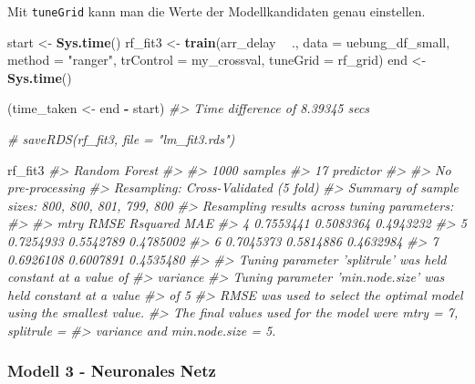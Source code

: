 \documentclass[]{article}
\newenvironment{Shaded}{\begin{snugshade}}{\end{snugshade}}
\newcommand{\CommentTok}[1]{\textcolor[rgb]{0.56,0.35,0.01}{\textit{#1}}}
\newcommand{\DataTypeTok}[1]{\textcolor[rgb]{0.13,0.29,0.53}{#1}}
\newcommand{\KeywordTok}[1]{\textcolor[rgb]{0.13,0.29,0.53}{\textbf{#1}}}
\newcommand{\NormalTok}[1]{#1}
\newcommand{\OperatorTok}[1]{\textcolor[rgb]{0.81,0.36,0.00}{\textbf{#1}}}
\newcommand{\StringTok}[1]{\textcolor[rgb]{0.31,0.60,0.02}{#1}}
\begin{document}
Mit \texttt{tuneGrid} kann man die Werte der Modellkandidaten genau
einstellen.

\begin{Shaded}
\begin{Highlighting}[]
\NormalTok{start <-}\StringTok{ }\KeywordTok{Sys.time}\NormalTok{()}
\NormalTok{rf_fit3 <-}\StringTok{ }\KeywordTok{train}\NormalTok{(arr_delay }\OperatorTok{~}\StringTok{ }\NormalTok{.,}
                 \DataTypeTok{data =}\NormalTok{ uebung_df_small,}
                 \DataTypeTok{method =} \StringTok{"ranger"}\NormalTok{,}
                 \DataTypeTok{trControl =}\NormalTok{ my_crossval,}
                 \DataTypeTok{tuneGrid =}\NormalTok{ rf_grid)}
\NormalTok{end <-}\StringTok{ }\KeywordTok{Sys.time}\NormalTok{()}


\NormalTok{(time_taken <-}\StringTok{ }\NormalTok{end }\OperatorTok{-}\StringTok{ }\NormalTok{start)}
\CommentTok{#> Time difference of 8.39345 secs}

\CommentTok{# saveRDS(rf_fit3, file = "lm_fit3.rds")}
\end{Highlighting}
\end{Shaded}

\begin{Shaded}
\begin{Highlighting}[]
\NormalTok{rf_fit3}
\CommentTok{#> Random Forest }
\CommentTok{#> }
\CommentTok{#> 1000 samples}
\CommentTok{#>   17 predictor}
\CommentTok{#> }
\CommentTok{#> No pre-processing}
\CommentTok{#> Resampling: Cross-Validated (5 fold) }
\CommentTok{#> Summary of sample sizes: 800, 800, 801, 799, 800 }
\CommentTok{#> Resampling results across tuning parameters:}
\CommentTok{#> }
\CommentTok{#>   mtry  RMSE       Rsquared   MAE      }
\CommentTok{#>   4     0.7553441  0.5083364  0.4943232}
\CommentTok{#>   5     0.7254933  0.5542789  0.4785002}
\CommentTok{#>   6     0.7045373  0.5814886  0.4632984}
\CommentTok{#>   7     0.6926108  0.6007891  0.4535480}
\CommentTok{#> }
\CommentTok{#> Tuning parameter 'splitrule' was held constant at a value of}
\CommentTok{#>  variance}
\CommentTok{#> Tuning parameter 'min.node.size' was held constant at a value}
\CommentTok{#>  of 5}
\CommentTok{#> RMSE was used to select the optimal model using the smallest value.}
\CommentTok{#> The final values used for the model were mtry = 7, splitrule =}
\CommentTok{#>  variance and min.node.size = 5.}
\end{Highlighting}
\end{Shaded}

\hypertarget{modell-3---neuronales-netz}{%
\subsubsection{Modell 3 - Neuronales
Netz}\label{modell-3---neuronales-netz}}
\end{document}

